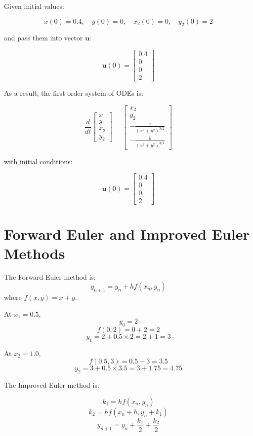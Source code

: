 \documentclass{article}
\begin{document}
Given initial values:

$$
    x(0) = 0.4, \quad y(0) = 0, \quad x_2(0) = 0, \quad y_2(0) = 2
$$

and pass them into vector $\mathbf{u}$:

$$
    \mathbf{u}(0) = \begin{bmatrix} 0.4 \\ 0 \\ 0 \\ 2 \end{bmatrix}
$$

As a result, the first-order system of ODEs is:

$$
    \frac{d}{dt} \begin{bmatrix} x \\ y \\ x_2 \\ y_2 \end{bmatrix} =
    \begin{bmatrix}
        x_2                           \\
        y_2                           \\
        - \frac{x}{(x^2 + y^2)^{3/2}} \\
        - \frac{y}{(x^2 + y^2)^{3/2}}
    \end{bmatrix}
$$

with initial conditions:

$$
    \mathbf{u}(0) = \begin{bmatrix} 0.4 \\ 0 \\ 0 \\ 2 \end{bmatrix}
$$

\newpage
\section{Forward Euler and Improved Euler Methods}
The Forward Euler method is:
$$
    y_{n+1} = y_n + h f(x_n, y_n)
$$
where $ f(x, y) = x + y $.

At $ x_1 = 0.5 $,
$$ y_0 = 2 $$
$$ f(0,2) = 0 + 2 = 2 $$
$$
    y_1 = 2 + 0.5 \times 2 = 2 + 1 = 3
$$

At $ x_2 = 1.0 $,
$$ f(0.5, 3) = 0.5 + 3 = 3.5 $$
$$
    y_2 = 3 + 0.5 \times 3.5 = 3 + 1.75 = 4.75
$$

The Improved Euler method is:

$$
    k_1 = hf(x_n, y_n)
$$
$$
    k_2 = hf(x_n + h, y_n + k_1)
$$
$$
    y_{n+1} = y_n + \frac{k_1}{2} + \frac{k_2}{2}
$$
\end{document}
